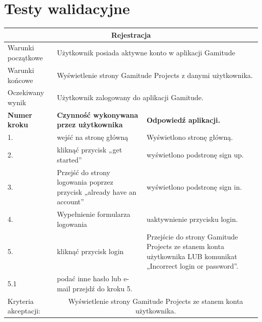 \documentclass[a4paper,11pt]{report}
\begin{document}
\section{Testy walidacyjne}
\begin{table}[H]
	\centering
	\begin{tabular}{|p{2cm}|p{6cm}|p{6cm}|}
	\hline
	\multicolumn{3}{|c|}{\textbf{Rejestracja}}\\
	\hline
	Warunki początkowe & \multicolumn{2}{|p{12cm}|}{Użytkownik posiada aktywne konto w aplikacji Gamitude}\\
	\hline
	Warunki końcowe & \multicolumn{2}{|p{12cm}|}{Wyświetlenie strony Gamitude Projects z danymi użytkownika.}\\
	\hline
	Oczekiwany wynik & \multicolumn{2}{|p{12cm}|}{Użytkownik zalogowany do aplikacji Gamitude.}\\
	\hline
	\textbf{Numer kroku} & \textbf{Czynność wykonywana przez użytkownika} & \textbf{Odpowiedź aplikacji.} \\
	\hline
	1. & wejść na stronę główną & Wyświetlono stronę główną. \\
	\hline
	2. & kliknąć przycisk „get started” & wyświetlono podstronę sign up. \\
	\hline
	3. & Przejść do strony logowania poprzez przycisk „already have an account” & wyświetlono podstronę sign in. \\
	\hline
	4. & Wypełnienie formularza logowania & uaktywnienie przycisku login. \\
	\hline
	5. & kliknąć przycisk login & Przejście do strony Gamitude Projects ze stanem konta użytkownika LUB komunikat „Incorrect login or password”. \\
	\hline
	5.1 & podać inne hasło lub e-mail przejdź do kroku 5. & \\
	\hline
	Kryteria akceptacji: & \multicolumn{2}{|c|}{Wyświetlenie strony Gamitude Projects ze stanem konta użytkownika.} \\
	\hline
	\end{tabular}
\end{table}
\end{document}
